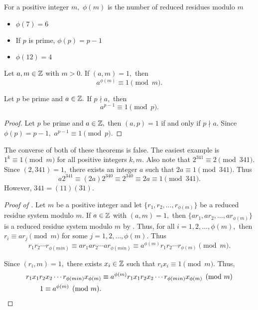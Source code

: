 \documentclass[letterpaper, 11 pt]{ximera}
\begin{document}
\begin{remark}
    For a positive integer $m,$ $\phi(m)$ is the number of reduced residues modulo $m$
\end{remark}
\begin{example}\label{example:phi}
    
    \begin{itemize}
        \item $\phi(7)=6$
        
        \item If $p$ is prime, $\phi(p)=p-1$
        
        \item $\phi(12)=4$
    \end{itemize}
\end{example}

\begin{thm*}\label{thm:euler-FlT}
    Let $a,m\in\mathbb Z$ with $m>0.$ If $(a,m)=1,$ then \[a^{\phi(m)}\equiv 1\pmod{m}.\]
\end{thm*}



\begin{cor*}\label{FlT}
    Let $p$ be prime and $a\in\mathbb Z.$ If $p\nmid a,$ then \[a^{p-1}\equiv 1\pmod{p}.\]
\end{cor*}

\begin{proof}
    Let $p$ be prime and $a\in\mathbb Z,$ then $(a,p)=1$ if and only if $p\nmid a.$ Since $\phi(p)=p-1,$ $a^{p-1}\equiv 1\pmod{p}.$
\end{proof}

\begin{warning}
    The converse of both of these theorems is false. The easiest example is $1^k\equiv 1\pmod{m}$ for all positive integers $k, m$. Also note that $2^{341}\equiv 2\pmod{341}$. Since $(2,341)=1,$ there exists an integer $a$ such that $2a\equiv 1\pmod{341}.$ Thus \[a2^{341}\equiv (2a)2^{340}\equiv 2^{340}\equiv 2a\equiv 1\pmod{341}.\]
    However, $341=(11)(31).$
\end{warning}

\begin{proof}[Proof of ]
    Let $m$ be a positive integer and let $\{r_1,r_2,\dots,r_{\phi(m)}\}$ be a reduced residue system modulo $m.$ If $a\in\mathbb Z$ with $(a,m)=1,$ then $\{ar_1,ar_2,\dots,ar_{\phi(m)}\}$ is a reduced residue system modulo $m$ by . Thus, for all $i=1,2,\dots, \phi(m),$ then $r_i\equiv a r_j\pmod{m}$ for some $j=1,2,\dots,\phi(m).$ Thus \[r_1 r_2\cdots r_{\phi(min)}\equiv ar_1 ar_2\cdots ar_{\phi(min)}\equiv a^{\phi(m)}r_1 r_2\cdots r_{\phi(m)} \pmod{m}.\]

    Since $(r_i,m)=1,$ there exists $x_i\in\mathbb Z$ such that $r_i x_i\equiv 1\pmod{m}.$ Thus, 
    \begin{align*}
        r_1 x_1 r_2 x_2\cdots r_{\phi(min)} x_{\phi(m)}&\equiv a^{\phi(m)} r_1 x_1 r_2 x_2\cdots r_{\phi(min)} x_{\phi(m)} \pmod{m}\\
        1\equiv a^{\phi(m)} \pmod{m}.\qedhere
    \end{align*}
\end{proof}
\end{document}
